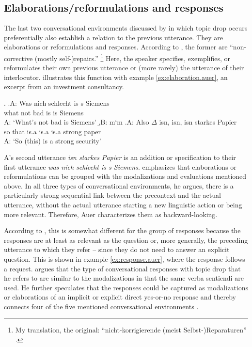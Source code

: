 \subsection{Elaborations/reformulations and responses}
The last two conversational environments discussed by \citet{auer1993} in which topic drop occurs preferentially also establish a relation to the previous utterance.
They are elaborations or reformulations and responses.
According to \citet[209]{auer1993}, the former are ``non-corrective (mostly self-)repairs.''%
\footnote{My translation, the original: ``nicht-korrigierende (meist Selbst-)Reparaturen'' \citep[209]{auer1993}.}
%
Here, the speaker specifies, exemplifies, or reformulates their own previous utterance or (more rarely) the utterance of their interlocutor.
\citet{auer1993} illustrates this function with example \ref{ex:elaboration.auer}, an excerpt from an investment consultancy. 

\ex.\label{ex:elaboration.auer}
\ag.A: Was nich schlecht is s Siemens\\
{} what not bad is is Siemens\\
A: `What's not bad is Siemens'
\b.B: m`m
\cg.A: Also $\Delta$ isn, isn, isn starkes Papier\\
{} so that is.a is.a is.a strong paper\\
A: `So (this) is a strong security' \citep[209, simplified]{auer1993}

A's second utterance \textit{isn starkes Papier} is an addition or specification to their first utterance \textit{was nich schlecht is s Siemens}.
\citet[210]{auer1993}  emphasizes that elaborations or reformulations can be grouped with the modalizations and evaluations mentioned above.
In all three types of conversational environments, he argues, there is a particularly strong sequential link between the precontext and the actual utterance, without the actual utterance starting a new linguistic action or being more relevant.
Therefore, Auer characterizes them as backward-looking.

According to \citet[212]{auer1993}, this is somewhat different for the group of responses because the responses are at least as relevant as the question or, more generally, the preceding utterance to which they refer -- since they do not need to answer an explicit question.
This is shown in example \ref{ex:response.auer}, where the response follows a request.
\citet{auer1993} argues that the type of conversational responses with topic drop that he refers to are similar to the modalizations in that the same verba sentiendi are used.
He further speculates that the responses could be captured as modalizations or elaborations of an implicit or explicit direct yes-or-no response and thereby connects four of the five mentioned conversational environments \citep[212]{auer1993}.

